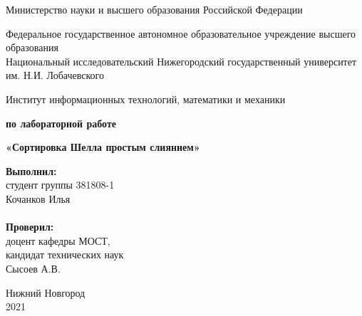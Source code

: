 \documentclass{report}
\begin{document}
\begin{titlepage}

\begin{center}
Министерство науки и высшего образования Российской Федерации
\end{center}

\begin{center}
Федеральное государственное автономное образовательное учреждение высшего образования \\
Национальный исследовательский Нижегородский государственный университет им. Н.И. Лобачевского
\end{center}

\begin{center}
Институт информационных технологий, математики и механики
\end{center}

\vspace{4em}

\begin{center}
\textbf{ по лабораторной работе} \\
\end{center}
\begin{center}
\textbf{\Large«Сортировка Шелла простым слиянием»} \\
\end{center}

\vspace{4em}

\newbox{\lbox}
\newlength{\maxl}
\setlength{\maxl}{\wd\lbox}
\hfill\parbox{7cm}{
\hspace*{5cm}\hspace*{-5cm}\textbf{Выполнил:} \\ студент группы 381808-1 \\ Кочанков Илья\\
\\
\hspace*{5cm}\hspace*{-5cm}\textbf{Проверил:}\\ доцент кафедры МОСТ, \\ кандидат технических наук \\ Сысоев А.В.\\
}
\vspace{\fill}

\begin{center} Нижний Новгород \\ 2021 \end{center}

\end{titlepage}
\end{document}

